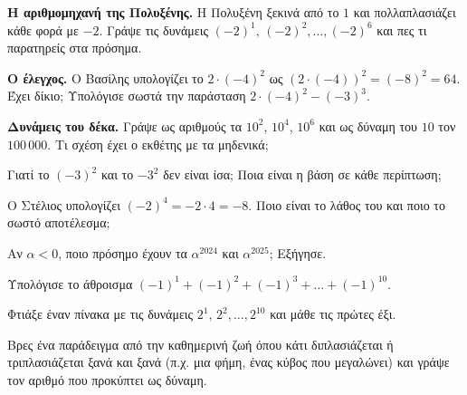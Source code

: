 \ex \textbf{Η αριθμομηχανή της Πολυξένης.} Η Πολυξένη ξεκινά από το $1$ και πολλαπλασιάζει κάθε φορά με $-2$. Γράψε τις δυνάμεις $(-2)^1,\,(-2)^2,\dots,(-2)^6$ και πες τι παρατηρείς στα πρόσημα.

\ex \textbf{Ο έλεγχος.} Ο Βασίλης υπολογίζει το $2\cdot(-4)^2$ ως $(2\cdot(-4))^2=(-8)^2=64$. Έχει δίκιο; Υπολόγισε σωστά την παράσταση $2\cdot(-4)^2-(-3)^3$.

\ex \textbf{Δυνάμεις του δέκα.} Γράψε ως αριθμούς τα $10^2$, $10^4$, $10^6$ και ως δύναμη του $10$ τον $100\,000$. Τι σχέση έχει ο εκθέτης με τα μηδενικά;


\ex Γιατί το $(-3)^2$ και το $-3^2$ δεν είναι ίσα; Ποια είναι η βάση σε κάθε περίπτωση;

\ex Ο Στέλιος υπολογίζει $(-2)^4=-2\cdot4=-8$. Ποιο είναι το λάθος του και ποιο το σωστό αποτέλεσμα;

\ex Αν $\alpha<0$, ποιο πρόσημο έχουν τα $\alpha^{2024}$ και $\alpha^{2025}$; Εξήγησε.

\ex Υπολόγισε το άθροισμα $(-1)^1+(-1)^2+(-1)^3+\ldots+(-1)^{10}$.


\ex Φτιάξε έναν πίνακα με τις δυνάμεις $2^1,\,2^2,\dots,2^{10}$ και μάθε τις πρώτες έξι.

\ex Βρες ένα παράδειγμα από την καθημερινή ζωή όπου κάτι διπλασιάζεται ή τριπλασιάζεται ξανά και ξανά (π.χ. μια φήμη, ένας κύβος που μεγαλώνει) και γράψε τον αριθμό που προκύπτει ως δύναμη.
